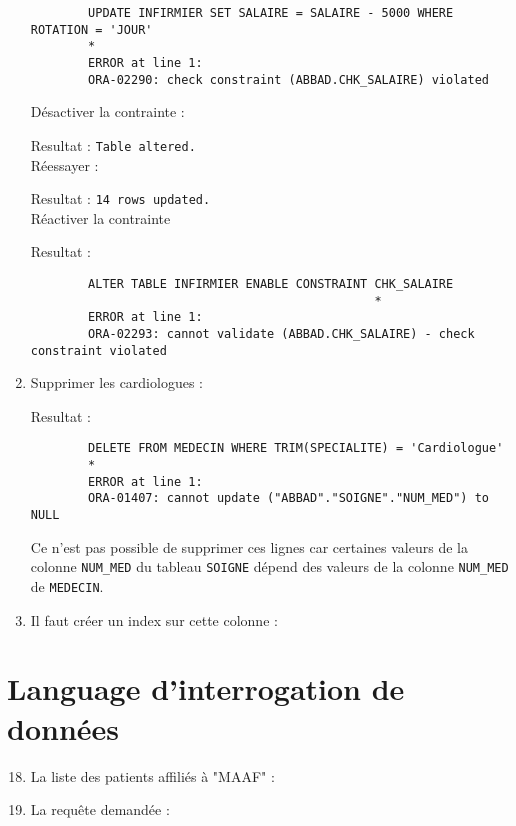 \documentclass[12pt,a4paper]{article}
\begin{document}
\begin{enumerate}
\begin{verbatim}
		UPDATE INFIRMIER SET SALAIRE = SALAIRE - 5000 WHERE ROTATION = 'JOUR'
		*
		ERROR at line 1:
		ORA-02290: check constraint (ABBAD.CHK_SALAIRE) violated
		\end{verbatim}
		Désactiver la contrainte :
		
		Resultat : \texttt{Table altered.}\\
		Réessayer :
		
		Resultat : \texttt{14 rows updated.}\\
		Réactiver la contrainte
		
		Resultat :
		\begin{verbatim}
		ALTER TABLE INFIRMIER ENABLE CONSTRAINT CHK_SALAIRE
		                                        *
		ERROR at line 1:
		ORA-02293: cannot validate (ABBAD.CHK_SALAIRE) - check constraint violated
		\end{verbatim}
		\item Supprimer les cardiologues :
		
		Resultat :
		\begin{verbatim}
		DELETE FROM MEDECIN WHERE TRIM(SPECIALITE) = 'Cardiologue'
		*
		ERROR at line 1:
		ORA-01407: cannot update ("ABBAD"."SOIGNE"."NUM_MED") to NULL
		\end{verbatim}
		Ce n'est pas possible de supprimer ces lignes car certaines valeurs de la colonne \texttt{NUM\_MED} du
		tableau \texttt{SOIGNE} dépend des valeurs de la colonne \texttt{NUM\_MED} de \texttt{MEDECIN}.
		\item Il faut créer un index sur cette colonne :
		
	\end{enumerate}
\section{Language d'interrogation de données}
	\begin{enumerate}
		\setcounter{enumi}{17}
		\item La liste des patients affiliés à "MAAF" :
		
		\item La requête demandée :
		
	\end{enumerate}
\end{document}
